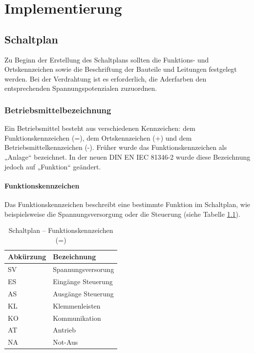 \chapter{Implementierung}
\label{chapter:Implementierung}

\section{Schaltplan}
\label{section:Schaltplan}
Zu Beginn der Erstellung des Schaltplans sollten die Funktions- und Ortskennzeichen sowie die Beschriftung der Bauteile und Leitungen festgelegt werden. Bei der Verdrahtung ist es erforderlich, die Aderfarben den entsprechenden Spannungspotenzialen zuzuordnen.

\subsection{Betriebsmittelbezeichnung}
\label{Schaltplan:BMK}

Ein Betriebsmittel besteht aus verschiedenen Kennzeichen: dem Funktionskennzeichen (=), dem Ortskennzeichen (+) und dem Betriebsmittelkennzeichen (-). Früher wurde das Funktionskennzeichen als „Anlage“ bezeichnet. In der neuen DIN EN IEC 81346-2 \cite{DIN_EN_IEC_81346-2} wurde diese Bezeichnung jedoch auf „Funktion“ geändert.

\subsubsection{Funktionskennzeichen}
Das Funktionskennzeichen beschreibt eine bestimmte Funktion im Schaltplan, wie beispielsweise die Spannungsversorgung oder die Steuerung (siehe Tabelle \ref{BMK:tab:funktionskennzeichen}).

\pagebreak[1]
\begin{table}[!ht]
	\centering
	\caption{Schaltplan – Funktionskennzeichen (=)}
	\label{BMK:tab:funktionskennzeichen}
	\begin{tabular}{ll}
		\hline
		\textbf{Abkürzung}      & \textbf{Bezeichnung} \\ \hline
		\multicolumn{1}{l|}{SV} & Spannungsversorung   \\
		\multicolumn{1}{l|}{ES} & Eingänge Steuerung   \\
		\multicolumn{1}{l|}{AS} & Ausgänge Steuerung   \\
		\multicolumn{1}{l|}{KL} & Klemmenleisten       \\
		\multicolumn{1}{l|}{KO} & Kommunikation        \\
		\multicolumn{1}{l|}{AT} & Antrieb              \\
		\multicolumn{1}{l|}{NA} & Not-Aus              \\ \hline
	\end{tabular}
\end{table}
\pagebreak[1]

